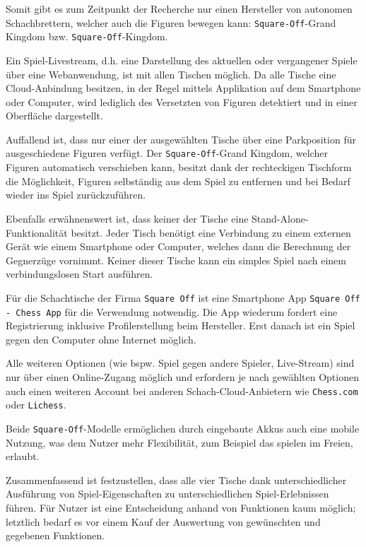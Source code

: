 Somit gibt es zum Zeitpunkt der Recherche nur einen Hersteller von
autonomen Schachbrettern, welcher auch die Figuren bewegen kann:
\passthrough{\lstinline!Square-Off!}-Grand Kingdom bzw.
\passthrough{\lstinline!Square-Off!}-Kingdom.

Ein Spiel-Livestream, d.h. eine Darstellung des aktuellen oder
vergangener Spiele über eine Webanwendung, ist mit allen Tischen
möglich. Da alle Tische eine Cloud-Anbindung besitzen, in der Regel
mittels Applikation auf dem Smartphone oder Computer, wird lediglich des
Versetzten von Figuren detektiert und in einer Oberfläche dargestellt.

Auffallend ist, dass nur einer der ausgewählten Tische über eine
Parkposition für ausgeschiedene Figuren verfügt. Der
\passthrough{\lstinline!Square-Off!}-Grand Kingdom, welcher Figuren
automatisch verschieben kann, besitzt dank der rechteckigen Tischform
die Möglichkeit, Figuren selbständig aus dem Spiel zu entfernen und bei
Bedarf wieder ins Spiel zurückzuführen.

Ebenfalls erwähnenswert ist, dass keiner der Tische eine
Stand-Alone-Funktionalität besitzt. Jeder Tisch benötigt eine Verbindung
zu einem externen Gerät wie einem Smartphone oder Computer, welches dann
die Berechnung der Gegnerzüge vornimmt. Keiner dieser Tische kann ein
simples Spiel nach einem verbindungslosen Start ausführen.

Für die Schachtische der Firma \passthrough{\lstinline!Square Off!} ist
eine Smartphone App
\passthrough{\lstinline!Square Off - Chess App!}\cite{squareoffapp}
für die Verwendung notwendig. Die App wiederum fordert eine
Registrierung inklusive Profilerstellung beim Hersteller. Erst danach
ist ein Spiel gegen den Computer ohne Internet möglich.

Alle weiteren Optionen (wie bspw. Spiel gegen andere Spieler,
Live-Stream) sind nur über einen Online-Zugang möglich und erfordern je
nach gewählten Optionen auch einen weiteren Account bei anderen
Schach-Cloud-Anbietern wie \passthrough{\lstinline!Chess.com!} oder
\passthrough{\lstinline!Lichess!}.

Beide \passthrough{\lstinline!Square-Off!}-Modelle ermöglichen durch
eingebaute Akkus auch eine mobile Nutzung, was dem Nutzer mehr
Flexibilität, zum Beispiel das spielen im Freien, erlaubt.

Zusammenfassend ist festzustellen, dass alle vier Tische dank
unterschiedlicher Ausführung von Spiel-Eigenschaften zu
unterschiedlichen Spiel-Erlebnissen führen. Für Nutzer ist eine
Entscheidung anhand von Funktionen kaum möglich; letztlich bedarf es vor
einem Kauf der Auswertung von gewünschten und gegebenen Funktionen.

